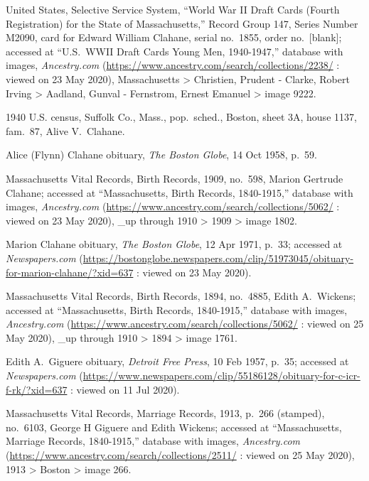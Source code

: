 \begin{thebibliography}{999}
United States, Selective Service System, ``World War II Draft Cards (Fourth Registration) for the State of Massachusetts,'' Record Group 147, Series Number M2090, card for Edward William Clahane, serial no.\ 1855, order no.\ [blank]; accessed at ``U.S.\ WWII Draft Cards Young Men, 1940-1947,'' database with images, \textit{Ancestry.com} (\url{https://www.ancestry.com/search/collections/2238/} : viewed on 23 May 2020), Massachusetts > Christien, Prudent - Clarke, Robert Irving > Aadland, Gunval - Fernstrom, Ernest Emanuel > image 9222.

1940 U.S. census, Suffolk Co., Mass., pop.\ sched., Boston, sheet 3A, house 1137, fam.\ 87, Alive V.\ Clahane.

Alice (Flynn) Clahane obituary, \textit{The Boston Globe}, 14 Oct 1958, p.\ 59.

Massachusetts Vital Records, Birth Records, 1909, no.\ 598, Marion Gertrude Clahane; accessed at ``Massachusetts, Birth Records, 1840-1915,'' database with images, \textit{Ancestry.com} (\url{https://www.ancestry.com/search/collections/5062/} : viewed on 23 May 2020), \_up through 1910 > 1909 > image 1802.

Marion Clahane obituary, \textit{The Boston Globe}, 12 Apr 1971, p.\ 33; accessed at \textit{Newspapers.com} (\url{https://bostonglobe.newspapers.com/clip/51973045/obituary-for-marion-clahane/?xid=637} : viewed on 23 May 2020).


Massachusetts Vital Records, Birth Records, 1894, no.\ 4885, Edith A.\ Wickens; accessed at ``Massachusetts, Birth Records, 1840-1915,'' database with images, \textit{Ancestry.com} (\url{https://www.ancestry.com/search/collections/5062/} : viewed on 25 May 2020), \_up through 1910 > 1894 > image 1761.

Edith A.\ Giguere obituary, \textit{Detroit Free Press}, 10 Feb 1957, p.\ 35; accessed at \textit{Newspapers.com} (\url{https://www.newspapers.com/clip/55186128/obituary-for-c-icr-f-rk/?xid=637} : viewed on 11 Jul 2020).

Massachusetts Vital Records, Marriage Records, 1913, p.\ 266 (stamped), no.\ 6103, George H Giguere and Edith Wickens; accessed at ``Massachusetts, Marriage Records, 1840-1915,'' database with images, \textit{Ancestry.com} (\url{https://www.ancestry.com/search/collections/2511/} : viewed on 25 May 2020), 1913 > Boston > image 266.


\end{thebibliography}
